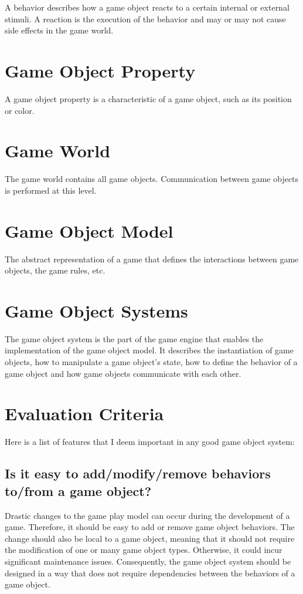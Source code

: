 \documentclass[
    phd,
    electronic,
    letterpaper,
    simplechapterheading,
    openany,
    parttop,
    lof,
]{byumsphd}
\begin{document}
A behavior describes how a game object reacts to a certain internal or external stimuli. A reaction is the execution of the behavior and may or may not cause side effects in the game world.


\section{Game Object Property}

A game object property is a characteristic of a game object, such as its position or color.


\section{Game World}

The game world contains all game objects. Communication between game objects is performed at this level.


\section{Game Object Model}

The abstract representation of a game that defines the interactions between game objects, the game rules, etc.


\section{Game Object Systems}

The game object system is the part of the game engine that enables the implementation of the game object model. It describes the instantiation of game objects, how to manipulate a game object's state, how to define the behavior of a game object and how game objects communicate with each other. 


\section{Evaluation Criteria}

Here is a list of features that I deem important in any good game object system:


\subsection{Is it easy to add/modify/remove behaviors to/from a game object?}

Drastic changes to the game play model can occur during the development of a game. Therefore, it should be easy to add or remove game object behaviors. The change should also be local to a game object, meaning that it should not require the modification of one or many game object types. Otherwise, it could incur significant maintenance issues. Consequently, the game object system should be designed in a way that does not require dependencies between the behaviors of a game object.
\end{document}
